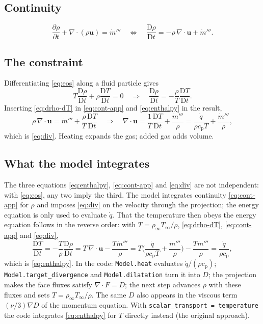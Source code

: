 \documentclass[11pt,a4paper]{article}
\newcommand{\vu}{\mathbf{u}}
\newcommand{\code}[1]{\texttt{#1}}
\begin{document}
\subsection{Continuity}
\begin{equation}\label{eq:cont-app}
  \frac{\partial\rho}{\partial t}+\nabla\cdot(\rho\vu)=\dot m'''
  \quad\Longleftrightarrow\quad
  \frac{\mathrm{D}\rho}{\mathrm{D}t}=-\rho\,\nabla\cdot\vu+\dot m'''.
\end{equation}

\subsection{The constraint}
Differentiating \eqref{eq:eos} along a fluid particle gives
\begin{equation}\label{eq:drho-dT}
  T\frac{\mathrm{D}\rho}{\mathrm{D}t}+\rho\frac{\mathrm{D}T}{\mathrm{D}t}=0
  \quad\Longrightarrow\quad
  \frac{\mathrm{D}\rho}{\mathrm{D}t}=-\frac{\rho}{T}\frac{\mathrm{D}T}{\mathrm{D}t}.
\end{equation}
Inserting \eqref{eq:drho-dT} in \eqref{eq:cont-app} and \eqref{eq:enthalpy} in the result,
\begin{equation}
  \rho\,\nabla\cdot\vu=\dot m'''+\frac{\rho}{T}\frac{\mathrm{D}T}{\mathrm{D}t}
  \quad\Longrightarrow\quad
  \nabla\cdot\vu=\frac{1}{T}\frac{\mathrm{D}T}{\mathrm{D}t}+\frac{\dot m'''}{\rho}
  =\frac{\dot q}{\rho c_\text{p}T}+\frac{\dot m'''}{\rho},
\end{equation}
which is \eqref{eq:div}. Heating expands the gas; added gas adds volume.

\subsection{What the model integrates}
The three equations \eqref{eq:enthalpy}, \eqref{eq:cont-app} and \eqref{eq:div} are not independent:
with \eqref{eq:eos}, any two imply the third. The model integrates continuity \eqref{eq:cont-app} for
$\rho$ and imposes \eqref{eq:div} on the velocity through the projection; the energy equation is only
used to evaluate $\dot q$. That the temperature then obeys the energy equation follows in the reverse
order: with $T=\rho_\infty T_\infty/\rho$, \eqref{eq:drho-dT}, \eqref{eq:cont-app} and \eqref{eq:div},
\begin{equation}
  \frac{\mathrm{D}T}{\mathrm{D}t}=-\frac{T}{\rho}\frac{\mathrm{D}\rho}{\mathrm{D}t}
  =T\,\nabla\cdot\vu-\frac{T\dot m'''}{\rho}
  =T\Big(\frac{\dot q}{\rho c_\text{p}T}+\frac{\dot m'''}{\rho}\Big)-\frac{T\dot m'''}{\rho}
  =\frac{\dot q}{\rho c_\text{p}},
\end{equation}
which is \eqref{eq:enthalpy}. In the code: \code{Model.heat} evaluates $\dot q/(\rho c_\text{p})$;
\code{Model.target\_divergence} and \code{Model.dilatation} turn it into $D$; the projection makes the
face fluxes satisfy $\nabla\cdot F=D$; the next step advances $\rho$ with these fluxes and sets
$T=\rho_\infty T_\infty/\rho$. The same $D$ also appears in the viscous term $(\nu/3)\nabla D$ of the
momentum equation. With \code{scalar\_transport = temperature} the code integrates
\eqref{eq:enthalpy} for $T$ directly instead (the original approach).
\end{document}
